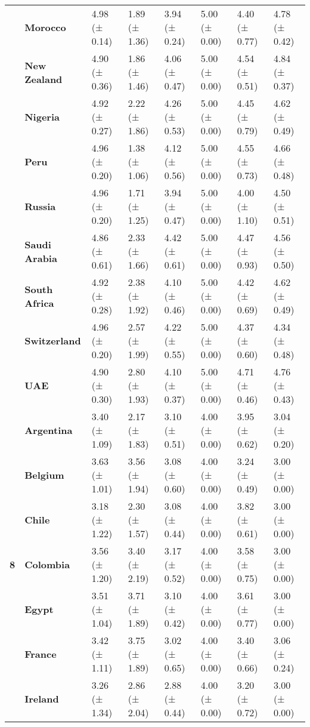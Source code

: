 \begin{longtable}{llllllll}
\textbf{} & \textbf{Morocco} & 4.98 (± 0.14) & 1.89 (± 1.36) & 3.94 (± 0.24) & 5.00 (± 0.00) & 4.40 (± 0.77) & 4.78 (± 0.42) \\
\textbf{} & \textbf{New Zealand} & 4.90 (± 0.36) & 1.86 (± 1.46) & 4.06 (± 0.47) & 5.00 (± 0.00) & 4.54 (± 0.51) & 4.84 (± 0.37) \\
\textbf{} & \textbf{Nigeria} & 4.92 (± 0.27) & 2.22 (± 1.86) & 4.26 (± 0.53) & 5.00 (± 0.00) & 4.45 (± 0.79) & 4.62 (± 0.49) \\
\textbf{} & \textbf{Peru} & 4.96 (± 0.20) & 1.38 (± 1.06) & 4.12 (± 0.56) & 5.00 (± 0.00) & 4.55 (± 0.73) & 4.66 (± 0.48) \\
\textbf{} & \textbf{Russia} & 4.96 (± 0.20) & 1.71 (± 1.25) & 3.94 (± 0.47) & 5.00 (± 0.00) & 4.00 (± 1.10) & 4.50 (± 0.51) \\
\textbf{} & \textbf{Saudi Arabia} & 4.86 (± 0.61) & 2.33 (± 1.66) & 4.42 (± 0.61) & 5.00 (± 0.00) & 4.47 (± 0.93) & 4.56 (± 0.50) \\
\textbf{} & \textbf{South Africa} & 4.92 (± 0.28) & 2.38 (± 1.92) & 4.10 (± 0.46) & 5.00 (± 0.00) & 4.42 (± 0.69) & 4.62 (± 0.49) \\
\textbf{} & \textbf{Switzerland} & 4.96 (± 0.20) & 2.57 (± 1.99) & 4.22 (± 0.55) & 5.00 (± 0.00) & 4.37 (± 0.60) & 4.34 (± 0.48) \\
\textbf{} & \textbf{UAE} & 4.90 (± 0.30) & 2.80 (± 1.93) & 4.10 (± 0.37) & 5.00 (± 0.00) & 4.71 (± 0.46) & 4.76 (± 0.43) \\
\cline{1-8}
\multirow[t]{19}{*}{\textbf{8}} & \textbf{Argentina} & 3.40 (± 1.09) & 2.17 (± 1.83) & 3.10 (± 0.51) & 4.00 (± 0.00) & 3.95 (± 0.62) & 3.04 (± 0.20) \\
\textbf{} & \textbf{Belgium} & 3.63 (± 1.01) & 3.56 (± 1.94) & 3.08 (± 0.60) & 4.00 (± 0.00) & 3.24 (± 0.49) & 3.00 (± 0.00) \\
\textbf{} & \textbf{Chile} & 3.18 (± 1.22) & 2.30 (± 1.57) & 3.08 (± 0.44) & 4.00 (± 0.00) & 3.82 (± 0.61) & 3.00 (± 0.00) \\
\textbf{} & \textbf{Colombia} & 3.56 (± 1.20) & 3.40 (± 2.19) & 3.17 (± 0.52) & 4.00 (± 0.00) & 3.58 (± 0.75) & 3.00 (± 0.00) \\
\textbf{} & \textbf{Egypt} & 3.51 (± 1.04) & 3.71 (± 1.89) & 3.10 (± 0.42) & 4.00 (± 0.00) & 3.61 (± 0.77) & 3.00 (± 0.00) \\
\textbf{} & \textbf{France} & 3.42 (± 1.11) & 3.75 (± 1.89) & 3.02 (± 0.65) & 4.00 (± 0.00) & 3.40 (± 0.66) & 3.06 (± 0.24) \\
\textbf{} & \textbf{Ireland} & 3.26 (± 1.34) & 2.86 (± 2.04) & 2.88 (± 0.44) & 4.00 (± 0.00) & 3.20 (± 0.72) & 3.00 (± 0.00) \\

\end{longtable}
